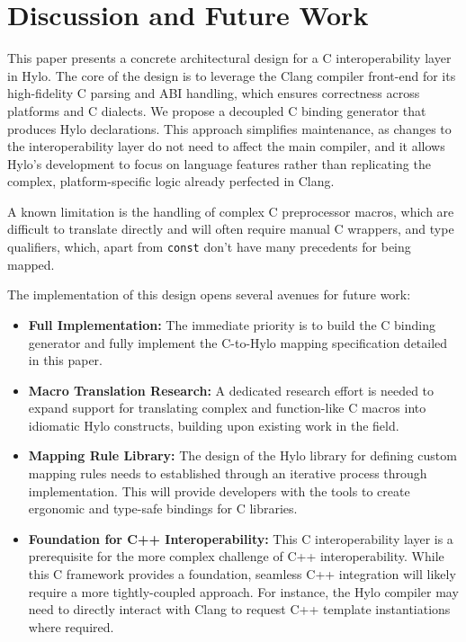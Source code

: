 \section{Discussion and Future Work}

This paper presents a concrete architectural design for a C interoperability layer in Hylo. The core of the design is to leverage the Clang compiler front-end for its high-fidelity C parsing and ABI handling, which ensures correctness across platforms and C dialects. We propose a decoupled C binding generator that produces Hylo declarations. This approach simplifies maintenance, as changes to the interoperability layer do not need to affect the main compiler, and it allows Hylo's development to focus on language features rather than replicating the complex, platform-specific logic already perfected in Clang.

A known limitation is the handling of complex C preprocessor macros, which are difficult to translate directly and will often require manual C wrappers, and type qualifiers, which, apart from \texttt{const} don't have many precedents for being mapped.

The implementation of this design opens several avenues for future work:
\begin{itemize}
    \item \textbf{Full Implementation:} The immediate priority is to build the C binding generator and fully implement the C-to-Hylo mapping specification detailed in this paper.
    \item \textbf{Macro Translation Research:} A dedicated research effort is needed to expand support for translating complex and function-like C macros into idiomatic Hylo constructs, building upon existing work in the field.
    \item \textbf{Mapping Rule Library:} The design of the Hylo library for defining custom mapping rules needs to established through an iterative process through implementation. This will provide developers with the tools to create ergonomic and type-safe bindings for C libraries.
    \item \textbf{Foundation for C++ Interoperability:} This C interoperability layer is a prerequisite for the more complex challenge of C++ interoperability. While this C framework provides a foundation, seamless C++ integration will likely require a more tightly-coupled approach. For instance, the Hylo compiler may need to directly interact with Clang to request C++ template instantiations where required.
\end{itemize}

